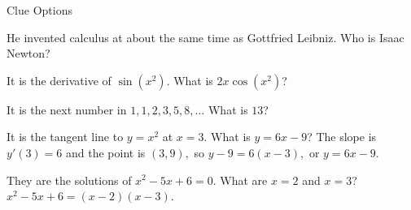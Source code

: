 \documentclass{article}
\begin{document}
\begin{category}{Clue Options}

  \begin{clue}[say]
    He invented calculus at about the same time as Gottfried Leibniz.
  \response
    Who is Isaac Newton?
  \end{clue}

  \begin{clue}[write]
    It is the derivative of $\sin\left(x^2\right).$
  \response
    What is $2x\cos\left(x^2\right)$?
  \end{clue}

  \begin{clue}
    It is the next number in $1, 1, 2, 3, 5, 8, \ldots$
  \response
    What is $13$?
  \end{clue}

  \begin{clue}
    It is the tangent line to $y = x^2$ at $x = 3.$
  \response
    What is $y = 6x - 9$?
  \solution
    The slope is $y'(3) = 6$ and the point is $(3, 9),$ so
    $y - 9 = 6(x - 3),$ or $y = 6x - 9.$
  \end{clue}

  \begin{clue}[say]
    They are the solutions of $x^2 - 5x + 6 = 0.$
  \response
    What are $x = 2$ and $x = 3$?
  \solution
    $x^2 - 5x + 6 = (x - 2)(x - 3).$
  \end{clue}

\end{category}
\end{document}
